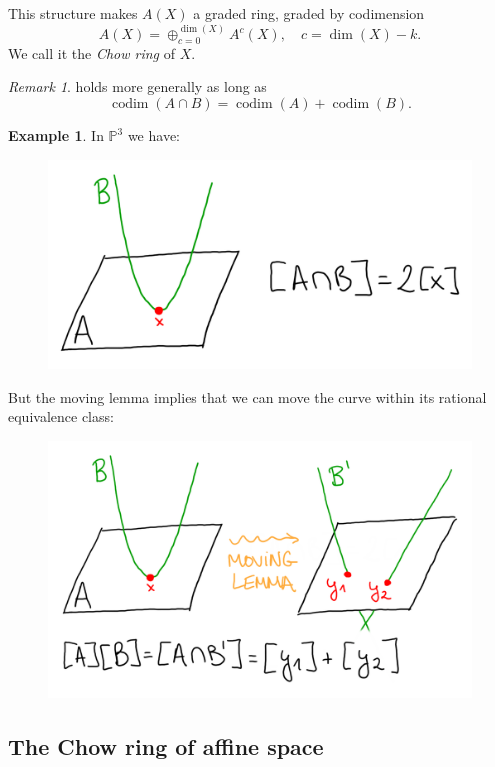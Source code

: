\documentclass[12pt,a4paper]{amsart}
\theoremstyle{plain}
\theoremstyle{definition}
\newtheorem{exmp}[thm]{Example}
\theoremstyle{remark}
\newtheorem{rem}[thm]{Remark}
\begin{document}
This structure makes $A(X)$ a graded ring, graded by codimension
\[ A(X)=\oplus_{c=0}^{\dim(X)}A^{c}(X), \quad c=\dim(X)-k. \]
We call it the \textit{Chow ring} of $X$.

\begin{rem}
     holds more generally as long as
    \[ \operatorname{codim}(A\cap B)=\operatorname{codim}(A)+\operatorname{codim}(B). \]
\end{rem}

\begin{exmp}
    In $\mathbb{P}^{3}$ we have:
    \begin{figure}[H]
	\centering
	\includegraphics[scale=.75]{pictures/planeandparabola}
    \end{figure}

    But the moving lemma implies that we can move the curve within its rational equivalence class:
    \begin{figure}[H]
	\centering
	\includegraphics[scale=.75]{pictures/parabolatolines}
    \end{figure}
\end{exmp}

\subsection{The Chow ring of affine space}
\end{document}
